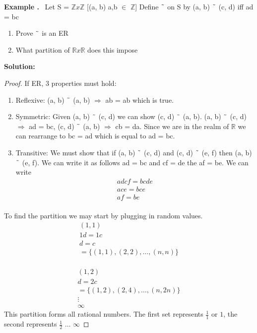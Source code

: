 \documentclass{article}
\newcounter{example}
\newcounter{solution}
\theoremstyle{definition}
\theoremstyle{claim}
\theoremstyle{remark}
\newcommand\Example{%
  \stepcounter{example}%
  \textbf{Example \theexample.}~%
  \setcounter{solution}{0}%
}
\newcommand\TheSolution{%
  \textbf{Solution:}\\%
}
\begin{document}
\begin{flushleft}
\Example Let S = $\mathbb{Z}x\mathbb{Z}$ [(a, b) a,b $\in$ $\mathbb{Z}$]
Define $\char`\~$ on S by (a, b) $\char`\~$ (c, d) iff ad = bc
\begin{enumerate}
  \item Prove $\char`\~$ is an ER
  \item What partition of $\mathbb{R}x\mathbb{R}$ does this impose
\end{enumerate}
\TheSolution 
\begin{proof}
If ER, 3 properties must hold:
\begin{enumerate}
  \item Reflexive: (a, b) $\char`\~$ (a, b) $\Longrightarrow$ ab = ab which is true.
  \item Symmetric: Given (a, b) $\char`\~$ (c, d) we can show (c, d) $\char`\~$ (a, b). (a, b) $\char`\~$ (c, d) $\Longrightarrow$ ad = bc, (c, d) $\char`\~$ (a, b) $\Longrightarrow$ cb = da. Since we are in the realm of $\mathbb{R}$ we can rearrange to bc = ad which is equal to ad = bc.
  \item Transitive: We must show that if (a, b) $\char`\~$ (c, d) and (c, d) $\char`\~$ (e, f) then (a, b) $\char`\~$ (e, f). We can write it as follows ad = bc and cf = de  the af = be.
  We can write 
  \begin{gather*} 
  adcf = bcde   \\
  ace = bce     \\
  af = be       \\
  \end{gather*} 
\end{enumerate}
To find the partition we may start by plugging in random values.\\
\begin{gather*} 
(1, 1)  \\
1d = 1c \\
d = c   \\
= \{(1, 1), (2, 2), \dots, (n, n)\}
\end{gather*}\\
\begin{gather*} 
(1, 2)\\
d = 2c\\
= \{(1, 2), (2, 4), \dots, (n, 2n)\}\\
\vdots\\
\infty
\end{gather*} 
This partition forms all rational numbers. The first set represents $\frac{1}{1}$ or $1$, the second represents $\frac{1}{2}$ $\dots$ $\infty$
\end{proof}

\end{flushleft}
\end{document}
